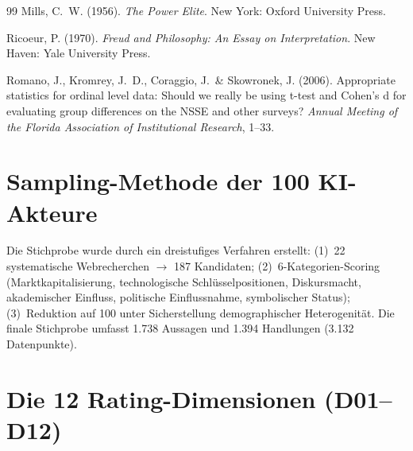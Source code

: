 \documentclass[12pt,a4paper]{article}
\begin{document}
\begin{thebibliography}{99}
  Mills, C.~W. (1956).
  \textit{The Power Elite}.
  New York: Oxford University Press.

  Ricoeur, P. (1970).
  \textit{Freud and Philosophy: An Essay on Interpretation}.
  New Haven: Yale University Press.

  Romano, J., Kromrey, J.~D., Coraggio, J.~\& Skowronek, J. (2006).
  Appropriate statistics for ordinal level data: Should we really be using t-test and Cohen's d for evaluating group differences on the NSSE and other surveys?
  \textit{Annual Meeting of the Florida Association of Institutional Research}, 1--33.

\end{thebibliography}


\newpage
\appendix

\section{Sampling-Methode der 100 KI-Akteure}
\label{app:sampling}

Die Stichprobe wurde durch ein dreistufiges Verfahren erstellt: (1)~22 systematische Webrecherchen $\to$ 187 Kandidaten; (2)~6-Kategorien-Scoring (Marktkapitalisierung, technologische Schl\"usselpositionen, Diskursmacht, akademischer Einfluss, politische Einflussnahme, symbolischer Status); (3)~Reduktion auf 100 unter Sicherstellung demographischer Heterogenit\"at. Die finale Stichprobe umfasst 1.738 Aussagen und 1.394 Handlungen (3.132 Datenpunkte).


\section{Die 12 Rating-Dimensionen (D01--D12)}
\label{app:dimensionen}
\end{document}
